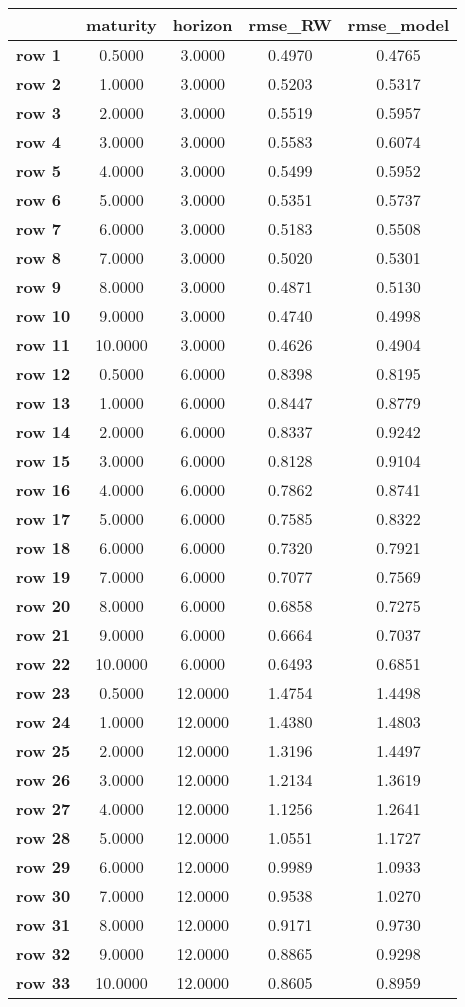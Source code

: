 \begin{tiny}\begin{tabular}{|l|c|c|c|c|}
\hline
&\textbf{maturity}&\textbf{horizon}&\textbf{rmse_RW}&\textbf{rmse_model}\\\hline
\textbf{row 1}&0.5000&3.0000&0.4970&0.4765\\\hline
\textbf{row 2}&1.0000&3.0000&0.5203&0.5317\\\hline
\textbf{row 3}&2.0000&3.0000&0.5519&0.5957\\\hline
\textbf{row 4}&3.0000&3.0000&0.5583&0.6074\\\hline
\textbf{row 5}&4.0000&3.0000&0.5499&0.5952\\\hline
\textbf{row 6}&5.0000&3.0000&0.5351&0.5737\\\hline
\textbf{row 7}&6.0000&3.0000&0.5183&0.5508\\\hline
\textbf{row 8}&7.0000&3.0000&0.5020&0.5301\\\hline
\textbf{row 9}&8.0000&3.0000&0.4871&0.5130\\\hline
\textbf{row 10}&9.0000&3.0000&0.4740&0.4998\\\hline
\textbf{row 11}&10.0000&3.0000&0.4626&0.4904\\\hline
\textbf{row 12}&0.5000&6.0000&0.8398&0.8195\\\hline
\textbf{row 13}&1.0000&6.0000&0.8447&0.8779\\\hline
\textbf{row 14}&2.0000&6.0000&0.8337&0.9242\\\hline
\textbf{row 15}&3.0000&6.0000&0.8128&0.9104\\\hline
\textbf{row 16}&4.0000&6.0000&0.7862&0.8741\\\hline
\textbf{row 17}&5.0000&6.0000&0.7585&0.8322\\\hline
\textbf{row 18}&6.0000&6.0000&0.7320&0.7921\\\hline
\textbf{row 19}&7.0000&6.0000&0.7077&0.7569\\\hline
\textbf{row 20}&8.0000&6.0000&0.6858&0.7275\\\hline
\textbf{row 21}&9.0000&6.0000&0.6664&0.7037\\\hline
\textbf{row 22}&10.0000&6.0000&0.6493&0.6851\\\hline
\textbf{row 23}&0.5000&12.0000&1.4754&1.4498\\\hline
\textbf{row 24}&1.0000&12.0000&1.4380&1.4803\\\hline
\textbf{row 25}&2.0000&12.0000&1.3196&1.4497\\\hline
\textbf{row 26}&3.0000&12.0000&1.2134&1.3619\\\hline
\textbf{row 27}&4.0000&12.0000&1.1256&1.2641\\\hline
\textbf{row 28}&5.0000&12.0000&1.0551&1.1727\\\hline
\textbf{row 29}&6.0000&12.0000&0.9989&1.0933\\\hline
\textbf{row 30}&7.0000&12.0000&0.9538&1.0270\\\hline
\textbf{row 31}&8.0000&12.0000&0.9171&0.9730\\\hline
\textbf{row 32}&9.0000&12.0000&0.8865&0.9298\\\hline
\textbf{row 33}&10.0000&12.0000&0.8605&0.8959\\\hline
\end{tabular}
\end{tiny}